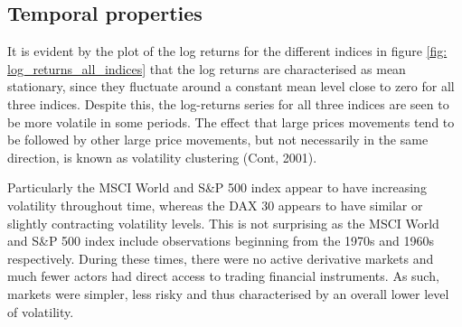 
\label{subsection: distributional properties}

 
\subsection{Temporal properties}
\label{subsection: temporal properties}
It is evident by the plot of the log returns for the different indices in figure \ref{fig: log_returns_all_indices} that the log returns are characterised as mean stationary, since they fluctuate around a constant mean level close to zero for all three indices. Despite this, the log-returns series for all three indices are seen to be more volatile in some periods. The effect that large prices movements tend to be followed by other large price movements, but not necessarily in the same direction, is known as volatility clustering (Cont, 2001). 

Particularly the MSCI World and S\&P 500 index appear to have increasing volatility throughout time, whereas the DAX 30 appears to have similar or slightly contracting volatility levels. This is not surprising as the MSCI World and S\&P 500 index include observations beginning from the 1970s and 1960s respectively. During these times, there were no active derivative markets and much fewer actors had direct access to trading financial instruments. As such, markets were simpler, less risky and thus characterised by an overall lower level of volatility. 


